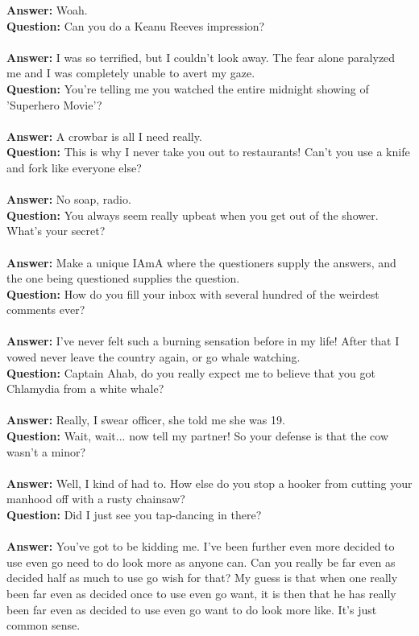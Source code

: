 \documentclass[a4paper]{article}
\begin{document}
\textbf{Answer:} Woah. \\
\textbf{Question:} Can you do a Keanu Reeves impression? \\ \\
\textbf{Answer:} I was so terrified, but I couldn't look away. The fear alone paralyzed me and I was completely unable to avert my gaze. \\
\textbf{Question:} You're telling me you watched the entire midnight showing of 'Superhero Movie'? \\ \\
\textbf{Answer:} A crowbar is all I need really. \\
\textbf{Question:} This is why I never take you out to restaurants! Can't you use a knife and fork like everyone else? \\ \\
\textbf{Answer:} No soap, radio. \\
\textbf{Question:} You always seem really upbeat when you get out of the shower. What's your secret? \\ \\
\textbf{Answer:} Make a unique IAmA where the questioners supply the answers, and the one being questioned supplies the question. \\
\textbf{Question:} How do you fill your inbox with several hundred of the weirdest comments ever? \\ \\
\textbf{Answer:} I've never felt such a burning sensation before in my life! After that I vowed never leave the country again, or go whale watching. \\
\textbf{Question:} Captain Ahab, do you really expect me to believe that you got Chlamydia from a white whale? \\ \\
\textbf{Answer:} Really, I swear officer, she told me she was 19. \\
\textbf{Question:} Wait, wait... now tell my partner! So your defense is that the cow wasn't a minor? \\ \\
\textbf{Answer:} Well, I kind of had to. How else do you stop a hooker from cutting your manhood off with a rusty chainsaw? \\
\textbf{Question:} Did I just see you tap-dancing in there? \\ \\
\textbf{Answer:} You've got to be kidding me. I've been further even more decided to use even go need to do look more as anyone can. Can you really be far even as decided half as much to use go wish for that? My guess is that when one really been far even as decided once to use even go want, it is then that he has really been far even as decided to use even go want to do look more like. It's just common sense. \\
\end{document}
